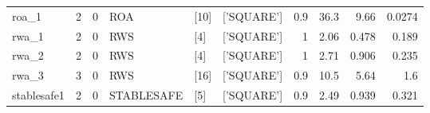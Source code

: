 \begin{tabular}{llllllrrrr}
    roa\_1             & 2     & 0     & ROA         & [10]    & ['SQUARE']           & 0.9    & 36.3                    & 9.66  & 0.0274 \\
    \cline{1-10} \cline{2-10} \cline{3-10} \cline{4-10} \cline{5-10}
    rwa\_1             & 2     & 0     & RWS         & [4]     & ['SQUARE']           & 1      & 2.06                    & 0.478 & 0.189  \\
    \cline{1-10} \cline{2-10} \cline{3-10} \cline{4-10} \cline{5-10}
    rwa\_2             & 2     & 0     & RWS         & [4]     & ['SQUARE']           & 1      & 2.71                    & 0.906 & 0.235  \\
    \cline{1-10} \cline{2-10} \cline{3-10} \cline{4-10} \cline{5-10}
    rwa\_3             & 3     & 0     & RWS         & [16]    & ['SQUARE']           & 0.9    & 10.5                    & 5.64  & 1.6    \\
    \cline{1-10} \cline{2-10} \cline{3-10} \cline{4-10} \cline{5-10}
    stablesafe1        & 2     & 0     & STABLESAFE  & [5]     & ['SQUARE']           & 0.9    & 2.49                    & 0.939 & 0.321  \\
    \cline{1-10} \cline{2-10} \cline{3-10} \cline{4-10} \cline{5-10}
    \bottomrule
\end{tabular}
